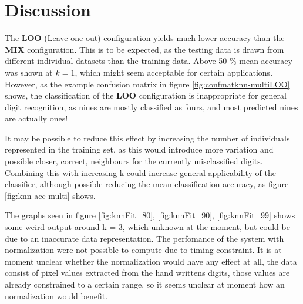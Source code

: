 \section{Discussion}
The \textbf{LOO} (Leave-one-out) configuration
yields much lower accuracy than the \textbf{MIX} configuration.
This is to be expected, as the testing data is drawn from different individual datasets
than the training data. Above 50 \% mean accuracy was shown at \(k=1\),
which might seem acceptable for certain applications.
However, as the example confusion matrix in figure \ref{fig:confmatknn-multiLOO} shows,
the classification of the \textbf{LOO} configuration is inappropriate
for general digit recognition, as nines are mostly classified as fours,
and most predicted nines are actually ones!

It may be possible to reduce this effect by increasing the number
of individuals represented in the training set, as this would introduce more
variation and possible closer, correct, neighbours for the currently
misclassified digits.
Combining this with increasing k could increase general applicability of the classifier,
although possible reducing the mean classification accuracy,
as figure \ref{fig:knn-acc-multi} shows.



The graphs seen in figure \ref{fig:knnFit_80}, \ref{fig:knnFit_90}, \ref{fig:knnFit_99} 
shows some weird output around k = 3, which unknown at the moment, but could be
due to an inaccurate data representation.  The perfomance of the system with normalization 
were not possible to compute due to timing constraint. It is at moment unclear whether
 the normalization would have any effect at all, the data consist of pixel values extracted from the 
hand writtens digits, those values are already constrained to a certain range,
 so it seems unclear at moment how an normalization would benefit.   
